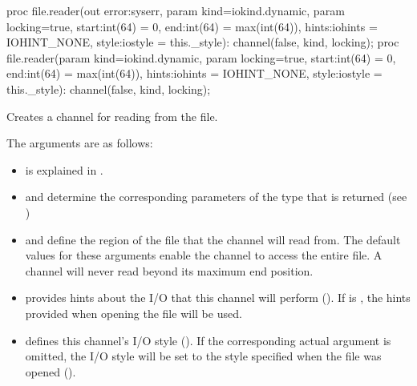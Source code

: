\begin{protohead}
proc file.reader(out error:syserr, param kind=iokind.dynamic, param locking=true,
                 start:int(64) = 0, end:int(64) = max(int(64)), hints:iohints = IOHINT_NONE,
                 style:iostyle = this._style): channel(false, kind, locking);
proc file.reader(param kind=iokind.dynamic, param locking=true,
                 start:int(64) = 0, end:int(64) = max(int(64)), hints:iohints = IOHINT_NONE,
                 style:iostyle = this._style): channel(false, kind, locking);
\end{protohead}
\begin{protobody}
Creates a channel for reading from the file.

The arguments are as follows:

\begin{itemize}

\item {} is explained in .

\item {} and  determine the corresponding parameters of
      the  type that is returned (see )

\item {} and  define the region of the file that
      the channel will read from. The default values for these arguments enable
      the channel to access the entire file.
      A channel will never read beyond its maximum end position.

\item {} provides hints about the I/O that this channel
      will perform ().
      If  is , the hints provided when opening
      the file will be used.

\item {} defines this channel's I/O style ().
      If the corresponding actual argument is omitted,
      the I/O style will be set to the style specified when the file
      was opened ().

\end{itemize}

\end{protobody}


